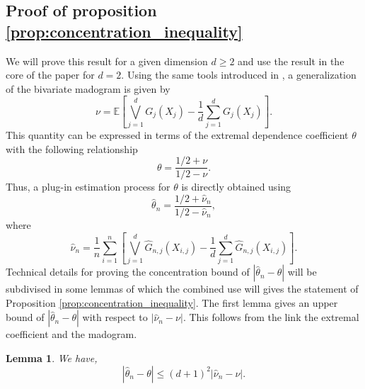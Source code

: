 \documentclass[11pt]{article}
\newtheorem{lemma}{Lemma}
\begin{document}
	\subsection{Proof of proposition \ref{prop:concentration_inequality}}
	\label{subsec:proof_concent_ineq}
	We will prove this result for a given dimension $d \geq 2$ and use the result in the core of the paper for $d=2$. Using the same tools introduced in \cite{MARCON20171}, a generalization of the bivariate madogram is given by
	\begin{equation*}
		\nu = \mathbb{E}\left[ \bigvee_{j=1}^d G_j(X_j) - \frac{1}{d} \sum_{j=1}^d G_j(X_j) \right].
	\end{equation*}
	This quantity can be expressed in terms of the extremal dependence coefficient $\theta$ with the following relationship
	\begin{equation*}
		\theta = \frac{1/2 + \nu}{1/2 - \nu}.
	\end{equation*}
	Thus, a plug-in estimation process for $\theta$ is directly obtained using
	\begin{equation*}
		\hat{\theta}_n = \frac{1/2 + \hat{\nu}_n}{1/2 - \hat{\nu}_n},
	\end{equation*}
	where 
	\begin{equation*}
		\hat{\nu}_n = \frac{1}{n} \sum_{i=1}^n \left[ \bigvee_{j=1}^d \hat{G}_{n,j}(X_{i,j}) - \frac{1}{d} \sum_{j=1}^d \hat{G}_{n,j}(X_{i,j}) \right].
	\end{equation*}
	Technical details for proving the concentration bound of $|\hat{\theta}_n - \theta|$ will be subdivised in some lemmas of which the combined use will gives the statement of Proposition \ref{prop:concentration_inequality}. The first lemma gives an upper bound of $|\hat{\theta}_n - \theta|$ with respect to $|\hat{\nu}_n - \nu|$. This follows from the link the extremal coefficient and the madogram.
	\begin{lemma}
		\label{lem:upper_bounds_ext_coeff}
		We have,
		\begin{equation*}
			|\hat{\theta}_n - \theta| \leq (d+1)^2 |\hat{\nu}_n - \nu |.
		\end{equation*}
	\end{lemma}
\end{document}
